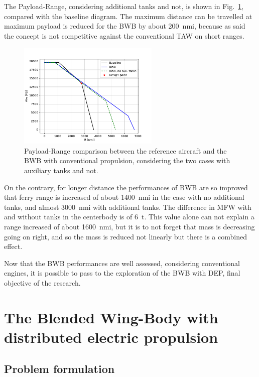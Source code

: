 The Payload-Range, considering additional tanks and not, is shown in Fig.~\ref{fig:bwb_pl_range}, compared with the baseline diagram. 
The maximum distance can be travelled at maximum payload is reduced for the BWB by about 200~nmi, because as said the concept is not competitive against the conventional TAW on short ranges.
\begin{figure}[!h]
	\centering
	\includegraphics[keepaspectratio, width=0.6\textwidth]{images/chap4/bwb_pl_range}
	\caption{Payload-Range comparison between the reference aircraft and the BWB with conventional propulsion, considering the two cases with auxiliary tanks and not.}
	\label{fig:bwb_pl_range}
\end{figure}
On the contrary, for longer distance the performances of BWB are so improved that ferry range is increased of about 1400~nmi in the case with no additional tanks, and almost 3000~nmi with additional tanks. 
The difference in MFW with and without tanks in the centerbody is of 6~\si{\tonne}. 
This value alone can not explain a range increased of about 1600~nmi, but it is to not forget that mass is decreasing going on right, and so the mass is reduced not linearly but there is a combined effect. 

Now that the BWB performances are well assessed, considering conventional engines, it is possible to pass to the exploration of the BWB with DEP, final objective of the research. 

\section{The Blended Wing-Body with distributed electric propulsion}
\label{sec:chap4_bwb_mdo_results}

\subsection{Problem formulation}
\label{subsec:chap4_bwb_optim_prob}

